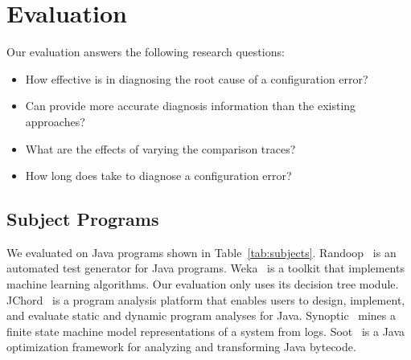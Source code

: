 \section{Evaluation}
\label{sec:evaluation}


Our evaluation answers the following research questions:



\begin{itemize}
\item How effective is \ourtool in diagnosing the root cause of
a configuration error?
\item Can \ourtool provide more accurate diagnosis information than
the existing approaches? 
\item What are the effects of varying the comparison traces?
\item How long does \ourtool take to diagnose a configuration error?
\end{itemize}


\subsection{Subject Programs}


We evaluated \ourtool on \subjectnum Java programs shown
in Table~\ref{tab:subjects}.
Randoop~\cite{randoop} is an automated test generator
for Java programs. Weka~\cite{weka} is a toolkit that implements
machine learning algorithms. Our evaluation
only uses its decision tree module. JChord~\cite{jchord}
is a program analysis platform that enables users to design, implement,
and evaluate static and dynamic program analyses for Java.
Synoptic~\cite{synoptic} mines a finite state machine
model representations of a system from logs.
Soot~\cite{soot} is a Java optimization framework for analyzing and transforming Java bytecode.


